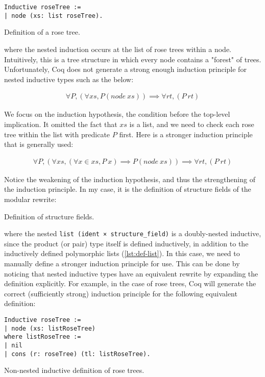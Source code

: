 \begin{listing}[H]
\begin{verbatim}
Inductive roseTree :=
| node (xs: list roseTree).
\end{verbatim}
  \caption{Definition of a rose tree.}
  \label{lst:def-rosetree}
\end{listing}

where the nested induction occurs at the list of rose trees within a node.
Intuitively, this is a tree structure in which every node contains a "forest" of
trees. Unfortunately, Coq does not generate a strong enough induction principle
for nested inductive types such as the below:

\begin{align*}
  \forall P, (\forall xs, P (node\ xs)) \implies \forall rt, (P\ rt)
\end{align*}

We focus on the induction hypothesis, the condition before the top-level
implication. It omitted the fact that $xs$ is a list, and we need to check each
rose tree within the list with predicate $P$ first. Here is a stronger induction
principle that is generally used:

\begin{align*}
  \forall P, (\forall xs, (\forall x\in xs, P\ x) \implies P (node\ xs))
   \implies \forall rt, (P\ rt)
\end{align*}

Notice the weakening of the induction hypothesis, and thus the strengthening of
the induction principle. In my case, it is the definition of structure fields of
the modular rewrite:

\begin{listing}[H]
  \caption{Definition of structure fields.}
  \label{lst:def-sf}
\end{listing}

where the nested \verb|list (ident × structure_field)| is a doubly-nested
inductive, since the product (or pair) type itself is defined inductively, in
addition to the inductively defined polymorphic lists (\ref{lst:def-list}). In
this case, we need to manually define a stronger induction principle for use.
This can be done by noticing that nested inductive types have an equivalent
rewrite by expanding the definition explicitly. For example, in the case of rose
trees, Coq will generate the correct (sufficiently strong) induction principle
for the following equivalent definition:

\begin{listing}[H]
\begin{verbatim}
Inductive roseTree :=
| node (xs: listRoseTree)
where listRoseTree :=
| nil
| cons (r: roseTree) (tl: listRoseTree).
\end{verbatim}
  \caption{Non-nested inductive definition of rose trees.}
  \label{lst:def-sf-nn}
\end{listing}

